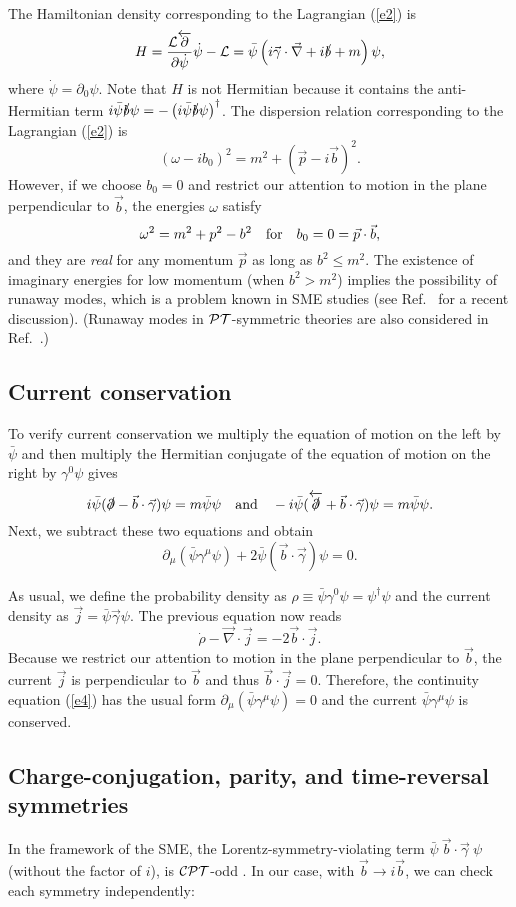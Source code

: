 \documentclass[11pt,prd,aps,amssymb,amsmath,tightenlines,showpacs]{revtex4}
\newcommand{\be}{\begin{equation}}
\newcommand{\ee}{\end{equation}}
\newcommand{\cPT}{{\cal PT}}
\newcommand{\cCPT}{{\cal CPT}}
\begin{document}
The Hamiltonian density corresponding to the Lagrangian (\ref{e2}) is
$$H=\frac{{\cal L}\overleftarrow\partial}{\partial\dot\psi}\dot\psi-{\cal L}=
\bar\psi\left(i\vec\gamma\cdot\vec\nabla+i\slashed b+m\right)\psi,$$
where $\dot\psi=\partial_0\psi$. Note that $H$ is not Hermitian because it
contains the anti-Hermitian term $i\bar\psi\slashed b\psi=-\left(i\bar\psi
\slashed b\psi\right)^\dag$. The dispersion relation corresponding to the
Lagrangian (\ref{e2}) is 
$$(\omega-ib_0)^2=m^2+(\vec p-i\vec b)^2.$$
However, if we choose $b_0=0$ and restrict our attention to motion in the plane
perpendicular to $\vec b$, the energies $\omega$ satisfy
\be
\omega^2=m^2+p^2-b^2\quad{\rm for}\quad b_0=0=\vec p\cdot\vec b,
\label{e3}
\ee
and they are {\it real} for any momentum $\vec p$ as long as $b^2\le m^2$. The
existence of imaginary energies for low momentum (when $b^2>m^2$) implies the
possibility of runaway modes, which is a problem known in SME studies (see
Ref.~\cite{r10} for a recent discussion). (Runaway modes in $\cPT$-symmetric
theories are also considered in Ref.~\cite{r11}.)

\subsection{Current conservation}
To verify current conservation we multiply the equation of motion on the left by
$\bar\psi$ and then multiply the Hermitian conjugate of the equation of motion
on the right by $\gamma^0\psi$ gives
$$i\bar\psi(\slashed\partial-\vec b\cdot\vec\gamma)\psi=m\bar\psi\psi\quad{\rm
and}\quad-i\bar\psi(\overleftarrow{\slashed\partial}+\vec b\cdot\vec\gamma)\psi
=m\bar\psi\psi.$$
Next, we subtract these two equations and obtain
$$\partial_\mu(\bar\psi\gamma^\mu\psi)+2\bar\psi(\vec b\cdot\vec\gamma)\psi=0.$$

As usual, we define the probability density as $\rho\equiv\bar\psi\gamma^0\psi=
\psi^\dag\psi$ and the current density as $\vec j=\bar\psi\vec\gamma\psi$.
The previous equation now reads
\be
\dot\rho-\vec\nabla\cdot\vec j=-2\vec b\cdot\vec j.
\label{e4}
\ee
Because we restrict our attention to motion in the plane perpendicular to $\vec
b$, the current $\vec j$ is perpendicular to $\vec b$ and thus $\vec b\cdot\vec
j=0$. Therefore, the continuity equation (\ref{e4}) has the usual form
$\partial_\mu(\bar\psi\gamma^\mu\psi)=0$ and the current $\bar\psi\gamma^\mu
\psi$ is conserved.

\subsection{Charge-conjugation, parity, and time-reversal symmetries}
In the framework of the SME, the Lorentz-symmetry-violating term $\bar\psi~\vec
b\cdot\vec\gamma~\psi$ (without the factor of $i$), is $\cCPT$-odd \cite{R7}.
In our case, with $\vec b\to i\vec b$, we can check each symmetry independently:
\end{document}
